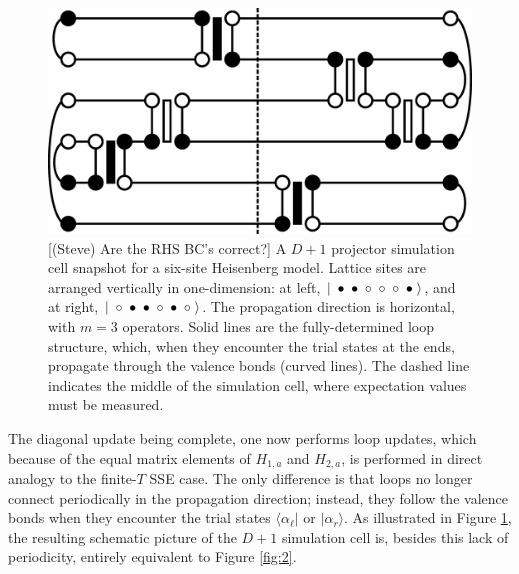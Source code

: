 \documentclass[vecphys]{svmult}
\begin{document}
\begin{figure}[t]
\centering
\includegraphics*[width=.85\textwidth]{zeroT_heis.eps}
\caption[]{{\color{red}[(Steve) Are the RHS BC's correct?]} A $D+1$ projector simulation cell snapshot for a six-site Heisenberg model.  Lattice sites are arranged vertically in one-dimension: 
at left, $ |  \hspace{1mm} \bullet  \hspace{1mm} \bullet  \hspace{1mm} \circ  \hspace{1mm} \circ  \hspace{1mm} \circ  \hspace{1mm} \bullet  \hspace{1mm} \rangle$, and at right,  $ |  \hspace{1mm} \circ  \hspace{1mm} \bullet  \hspace{1mm} \bullet  \hspace{1mm} \circ  \hspace{1mm} \bullet  \hspace{1mm} \circ \hspace{1mm}  \rangle$.
The propagation direction is horizontal, with $m=3$ operators.  Solid lines are the fully-determined loop structure, which, when they encounter the trial states at the ends, propagate through the valence bonds (curved lines).  The dashed line indicates the middle of the simulation cell, where expectation values must be measured.}
\label{fig:3}       %
\end{figure} 

The diagonal update being complete, one now performs loop updates, which because of the equal matrix elements of $H_{1,a}$ and $H_{2,a}$, is performed in direct analogy to the finite-$T$ SSE case.  The only difference is that loops no longer connect periodically in the propagation direction; instead, they follow the valence bonds when they encounter the trial states $\langle \alpha_{\ell} |$ or $| \alpha_r \rangle$.  As illustrated in Figure \ref{fig:3}, the resulting schematic picture of the $D+1$ simulation cell is, besides this lack of periodicity, entirely equivalent to Figure \ref{fig:2}.
\end{document}
